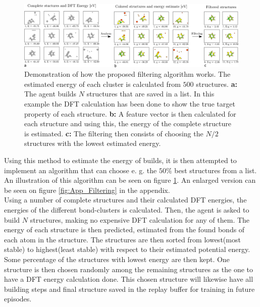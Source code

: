 \begin{figure}
	\centering
	\centerline{
		\includegraphics[width=1.4\columnwidth]{graphics/filtering_demo.pdf}
		}
	\captionsetup{width=1.4\columnwidth}
	\caption{Demonstration of how the proposed filtering algorithm works. The estimated energy of each cluster is calculated from $500$ structures. \textbf{a:} The agent builds $N$ structures that are saved in a list. In this example the DFT calculation has been done to show the true target property of each structure. \textbf{b:} A feature vector is then calculated for each structure and using this, the energy of the complete structure is estimated. \textbf{c:} The filtering then consists of choosing the $N/2$ structures with the lowest estimated energy.}
	\label{fig:filtering}
\end{figure}

Using this method to estimate the energy of builds, it is then attempted to implement an algorithm that can choose e. g. the $50\%$ best structures from a list. An illustration of this algorithm can be seen on figure \ref{fig:filtering}. An enlarged version can be seen on figure \ref{fig:App_Filtering} in the appendix. \\

Using a number of complete structures and their calculated DFT energies, the energies of the different bond-clusters is calculated. Then, the agent is asked to build $N$ structures, making no expensive DFT calculation for any of them. The energy of each structure is then predicted, estimated from the found bonds of each atom in the structure. The structures are then sorted from lowest(most stable) to highest(least stable) with respect to their estimated potential energy. Some percentage of the structures with lowest energy are then kept. One structure is then chosen randomly among the remaining structures as the one to have a DFT energy calculation done. This chosen structure will likewise have all building steps and final structure saved in the replay buffer for training in future episodes. \\

